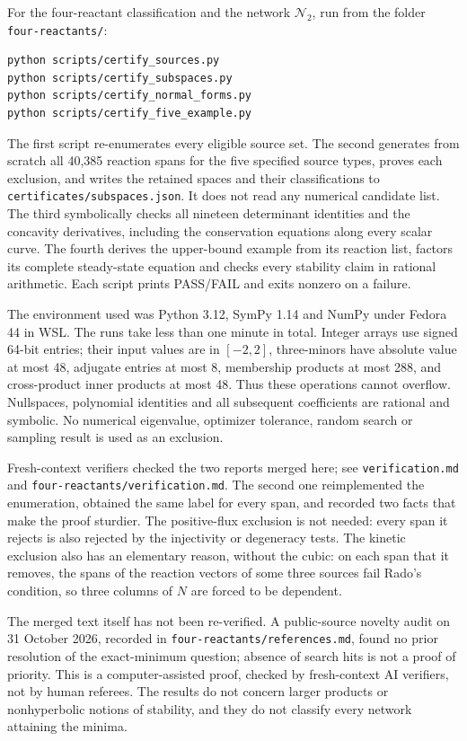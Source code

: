 \documentclass[11pt,a4paper]{report}
\begin{document}
For the four-reactant classification and the network $\mathcal N_2$, run from the folder \texttt{four-reactants/}:
\begin{verbatim}
python scripts/certify_sources.py
python scripts/certify_subspaces.py
python scripts/certify_normal_forms.py
python scripts/certify_five_example.py
\end{verbatim}
The first script re-enumerates every eligible source set. The second generates from scratch all
40,385 reaction spans for the five specified source types, proves each exclusion, and writes the
retained spaces and their classifications to \texttt{certificates/subspaces.json}. It does not read
any numerical candidate list. The third symbolically checks all nineteen determinant identities
and the concavity derivatives, including the conservation equations along every scalar curve.
The fourth derives the upper-bound example from its reaction list, factors its complete steady-state
equation and checks every stability claim in rational arithmetic.
Each script prints PASS/FAIL and exits nonzero on a failure.

The environment used was Python 3.12, SymPy 1.14 and NumPy under Fedora 44 in WSL. The runs take
less than one minute in total. Integer arrays use signed 64-bit entries; their input values are
in $[-2,2]$, three-minors have absolute value at most 48, adjugate entries at most 8, membership
products at most 288, and cross-product inner products at most 48. Thus these operations cannot
overflow. Nullspaces, polynomial identities and all subsequent coefficients are rational and symbolic.
No numerical eigenvalue, optimizer tolerance, random search or sampling result is used as an exclusion.

Fresh-context verifiers checked the two reports merged here; see \texttt{verification.md} and
\texttt{four-reactants/verification.md}. The second one reimplemented the enumeration, obtained the same label for
every span, and recorded two facts that make the proof sturdier. The positive-flux exclusion is not needed: every
span it rejects is also rejected by the injectivity or degeneracy tests. The kinetic exclusion also has an elementary
reason, without the cubic: on each span that it removes, the spans of the reaction vectors of some three sources
fail Rado's condition, so three columns of $N$ are forced to be dependent.

The merged text itself has not been re-verified. A public-source novelty audit on 31 October 2026, recorded in
\texttt{four-reactants/references.md}, found no prior resolution of the exact-minimum question; absence of search hits
is not a proof of priority. This is a computer-assisted proof, checked by fresh-context AI verifiers, not by human
referees. The results do not concern larger products or nonhyperbolic notions of stability, and they do not classify
every network attaining the minima.

\paperreferences
\end{document}
